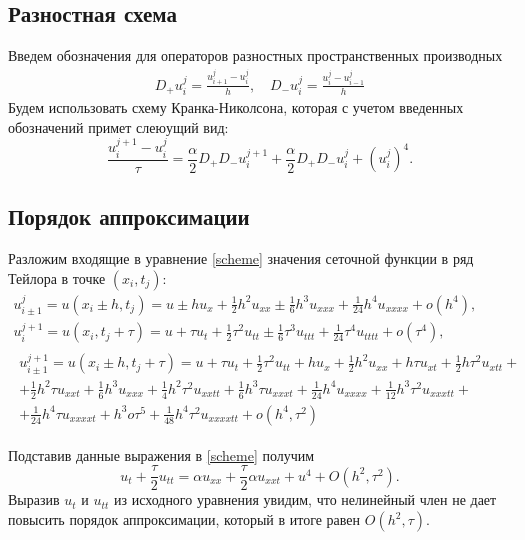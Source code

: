 \documentclass[a4paper,12pt]{article}
\begin{document}
\subsection*{Разностная схема}
Введем обозначения для операторов разностных пространственных производных
\begin{gather*}
  D_{+}u_{i}^{j}=\frac{u_{i+1}^{j}-u_{i}^{j}}{h}, \quad D_{-}u_{i}^{j}=\frac{u_{i}^{j}-u_{i-1}^{j}}{h}
\end{gather*}
Будем использовать схему Кранка-Николсона, которая с учетом введенных обозначений примет слеюущий вид:
\begin{equation}\label{scheme}
  \frac{u_{i}^{j+1}-u_{i}^{j}}{\tau}=\frac{\alpha}{2}D_{+}D_{-}u_{i}^{j+1}+\frac{\alpha}{2}D_{+}D_{-}u_{i}^{j} + \left(u_{i}^{j}\right)^4.
\end{equation}

\subsection*{Порядок аппроксимации}

Разложим входящие в уравнение \cref{scheme} значения сеточной функции в ряд Тейлора в точке \((x_i, t_j)\):
\begin{gather*}
  u_{i\pm1}^{j}=u(x_{i}\pm h, t_{j})=u \pm h u_x +\frac{1}{2} h^2 u_{xx} \pm \frac{1}{6} h^3 u_{xxx} + \frac{1}{24} h^4 u_{xxxx} + o(h^{4}),\\
  u_{i}^{j+1}=u(x_{i}, t_{j}+\tau)=u + \tau u_t +\frac{1}{2} \tau^2 u_{tt} \pm \frac{1}{6} \tau^3 u_{ttt} + \frac{1}{24} \tau^4 u_{tttt} + o(\tau^{4}),\\
  \begin{split}
    u_{i\pm1}^{j+1}=u(x_{i}\pm h,t_{j}+\tau)=u+\tau  u_t+\frac{1}{2} \tau ^2 u_{tt}+h u_x+\frac{1}{2} h^2 u_{xx}+h \tau  u_{xt}+\frac{1}{2} h \tau ^2 u_{xtt}+\\
    +\frac{1}{2} h^2 \tau  u_{xxt}+\frac{1}{6} h^3 u_{xxx}+\frac{1}{4} h^2 \tau ^2 u_{xxtt}+\frac{1}{6} h^3 \tau  u_{xxxt}+\frac{1}{24} h^4 u_{xxxx}+\frac{1}{12} h^3 \tau ^2 u_{xxxtt}+\\
    +\frac{1}{24} h^4 \tau  u_{xxxxt}+h^3 o \tau ^5+\frac{1}{48} h^4 \tau ^2 u_{xxxxtt}+o(h^4, \tau^2)
  \end{split}
\end{gather*}

Подставив данные выражения в \cref{scheme} получим
\begin{equation*}
  u_{t}+\frac{\tau}{2} u_{tt} = \alpha u_{xx} + \frac{\tau}{2} \alpha u_{xxt} + u^4 + O(h^2, \tau^2).
\end{equation*}
Выразив \(u_{t}\) и \(u_{tt}\) из исходного уравнения увидим, что нелинейный член не дает повысить порядок аппроксимации, который в итоге равен \(O(h^2, \tau)\).
\end{document}
